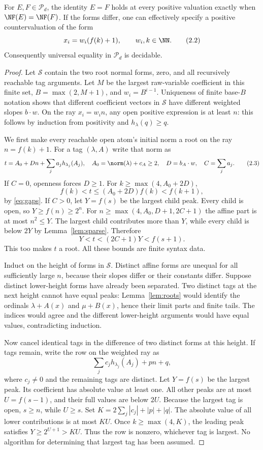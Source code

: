 \documentclass[11pt,a4paper]{article}
\begin{document}
\begin{theorem}\label{thm:identity}
For $E,F\in\mathcal P_d$, the identity $E=F$ holds at every positive
valuation exactly when $\NF(E)=\NF(F)$. If the forms differ, one can
effectively specify a positive countervaluation of the form
\[
           x_i=w_i(f(k)+1),\qquad w_i,k\in\NN.        \tag{2.2}
\]
Consequently universal equality in $\mathcal P_d$ is decidable.
\end{theorem}
\begin{proof}
Let $\mathcal S$ contain the two root normal forms, zero, and all recursively
reachable tag arguments. Let $M$ be the largest raw-variable coefficient
in this finite set, $B=\max(2,M+1)$, and $w_i=B^{i-1}$.
Uniqueness of finite base-$B$ notation shows that different coefficient
vectors in $\mathcal S$ have different weighted slopes $b\cdot w$.
On the ray $x_i=w_i n$, any open positive expression is at least $n$:
this follows by induction from positivity and $h_\lambda(q)\ge q$.

We first make every reachable open atom's initial norm a root on the ray
$n=f(k)+1$. For a tag $(\lambda,A)$ write that norm as
\[
 t= A_0+Dn+\sum_j a_j h_{\lambda_j}(A_j),\quad
 A_0=\norm(\lambda)+c_A\ge2,\quad D=b_A\cdot w,
 \quad C=\sum_j a_j.                                 \tag{2.3}
\]
If $C=0$, openness forces $D\ge1$. For $k\ge\max(4,A_0+2D)$,
\[
          f(k)<t\le(A_0+2D)f(k)<f(k+1),
\]
by \eqref{eq:gaps}. If $C>0$, let $Y=f(s)$ be the largest child peak.
Every child is open, so $Y\ge f(n)\ge2^n$. For
$n\ge\max(4,A_0,D+1,2C+1)$ the affine part is at most $n^2\le Y$.
The largest child contributes more than $Y$, while every child is below
$2Y$ by Lemma~\ref{lem:sparse}. Therefore
\[
                 Y<t<(2C+1)Y<f(s+1).                \tag{2.4}
\]
This too makes $t$ a root. All these bounds are finite syntax data.

Induct on the height of forms in $\mathcal S$. Distinct affine forms are
unequal for all sufficiently large $n$, because their slopes differ or
their constants differ. Suppose distinct lower-height forms have already
been separated. Two distinct tags at the next height cannot have equal
peaks: Lemma~\ref{lem:roots} would identify the ordinals
$\lambda+A(x)$ and $\mu+B(x)$, hence their limit parts and finite tails.
The indices would agree and the different lower-height arguments would
have equal values, contradicting induction.

Now cancel identical tags in the difference of two distinct forms at this
height. If tags remain, write the row on the weighted ray as
\[
                \sum_j c_j h_{\lambda_j}(A_j)+pn+q,  \tag{2.5}
\]
where $c_j\ne0$ and the remaining tags are distinct. Let $Y=f(s)$ be the
largest peak. Its coefficient has absolute value at least one. All other
peaks are at most $U=f(s-1)$, and their full values are below $2U$.
Because the largest tag is open, $s\ge n$, while $U\ge s$. Set
$K=2\sum_j|c_j|+|p|+|q|$. The absolute value of all lower contributions
is at most $KU$. Once $k\ge\max(4,K)$, the leading peak satisfies
$Y\ge2^{U+1}>KU$. Thus the row is nonzero, whichever tag is largest.
No algorithm for determining that largest tag has been assumed.


\end{proof}
\end{document}
